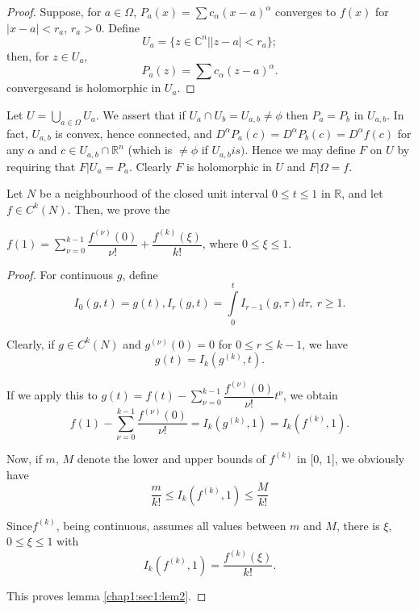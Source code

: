\begin{proof}
  Suppose, for $a \in \Omega$, $P_a(x) = \sum
  c_{\alpha}(x-a)^{\alpha}$ converges to $f(x)$ for $|x -a| < r_a$,
  $r_a> 0$. Define 
  $$
  U_a = \{ z \in \mathbb{C}^n \big| |z-a | < r_a \};
  $$
  then, for $z \in U_a$,
  $$
  P_a(z) = \sum c_{\alpha}(z-a)^\alpha.
  $$
  converges\pageoriginale and is holomorphic in $U_a$.
\end{proof}

Let $U = \bigcup \limits_{a \in \Omega} U_a$. We assert that if $U_a
\cap U_b = U_{a, b} \neq \phi$ then $P_a = P_b$ in $U_{a, b}$. In
fact, $U_{a, b}$ is convex, hence connected, and $D^{\alpha} P_a (c) =
D^{\alpha} P_b (c)= D^{\alpha} f(c)$ for any $\alpha$ and $c \in U_{a,
  b} \cap \mathbb{R}^n$ (which is $\neq \phi$ if $U_{a, b} is
)$. Hence we may define $F$ on $U$ by requiring that $F| U_a =
P_a$. Clearly $F$ is holomorphic in $U$ and $F| \Omega = f$. 

Let $N$ be a neighbourhood of the closed unit interval $0 \leq t \leq
1$ in $\mathbb{R}$, and let $f \in C^k (N)$. Then, we prove the  

\begin{lemma}\label{chap1:sec1:lem2}%
  $f(1) = \sum \limits^{k-1}_{\nu = 0} \dfrac{f^{(\nu)} (0)}{\nu !} +
  \dfrac{f^{(k)}(\xi)}{k !}$, where $0 \leq \xi \leq 1$. 
\end{lemma}

\begin{proof}
  For continuous $g$, define
  $$
  I_0 (g, t) = g(t), I_r (g, t) = \int \limits^t_0 I_{r-1} (g, \tau) d
  \tau, ~r \geq 1. 
  $$
  
  Clearly, if $g \in C^k (N)$ and $g^{(\nu)} (0) = 0$ for $0 \leq r \leq k-1$, we have 
  $$
  g(t) = I_k (g^{(k)}, t).
  $$
  
  If we apply this to $g(t) = f(t) - \sum \limits^{k-1}_{\nu = 0}
  \dfrac{f^{(\nu)} (0)}{\nu !} t^{\nu}$, we obtain  
  \begin{equation}
    f(1) - \sum^{k-1}_{\nu = 0} \frac{f^{(\nu)} (0)}{\nu !} = I_k
    (g^{(k)}, 1) = I_k (f^{(k)}, 1). \tag{1.1}\label{chap1:sec1:eq1.1} 
  \end{equation}

  Now, if $m$, $M$ denote the lower and upper bounds of $f^{(k)}$ in
  [$0$, $1$], we obviously have  
  $$
  \frac{m}{k!} \leq I_k (f^{(k)}, 1) \leq \frac{M}{k!}
  $$

  Since\pageoriginale $f^{(k)}$, being continuous, assumes all values between $m$
  and $M$, there is $\xi$, $0 \leq \xi \leq 1$ with  
  $$
  I_k (f^{(k)}, 1)= \frac{f^{(k)} (\xi)}{k!}.
  $$
  
This proves lemma \ref{chap1:sec1:lem2}.
\end{proof}

